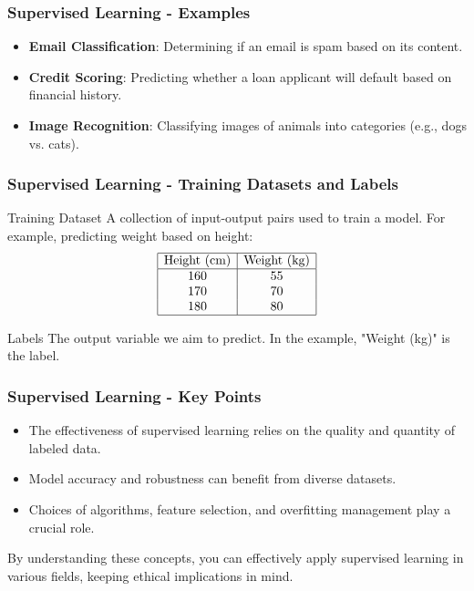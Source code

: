 \documentclass[aspectratio=169]{beamer}
\begin{document}
\begin{frame}[fragile]
    \frametitle{Supervised Learning - Examples}
    \begin{itemize}
        \item \textbf{Email Classification}: Determining if an email is spam based on its content.
        \item \textbf{Credit Scoring}: Predicting whether a loan applicant will default based on financial history.
        \item \textbf{Image Recognition}: Classifying images of animals into categories (e.g., dogs vs. cats).
    \end{itemize}
\end{frame}

\begin{frame}[fragile]
    \frametitle{Supervised Learning - Training Datasets and Labels}
    \begin{block}{Training Dataset}
        A collection of input-output pairs used to train a model. For example, predicting weight based on height:
        \[
        \begin{array}{|c|c|}
        \hline
        \text{Height (cm)} & \text{Weight (kg)} \\
        \hline
        160 & 55 \\
        170 & 70 \\
        180 & 80 \\
        \hline
        \end{array}
        \]
    \end{block}

    \begin{block}{Labels}
        The output variable we aim to predict. In the example, "Weight (kg)" is the label.
    \end{block}
\end{frame}

\begin{frame}[fragile]
    \frametitle{Supervised Learning - Key Points}
    \begin{itemize}
        \item The effectiveness of supervised learning relies on the quality and quantity of labeled data.
        \item Model accuracy and robustness can benefit from diverse datasets.
        \item Choices of algorithms, feature selection, and overfitting management play a crucial role.
    \end{itemize}
    
    By understanding these concepts, you can effectively apply supervised learning in various fields, keeping ethical implications in mind.
\end{frame}
\end{document}

